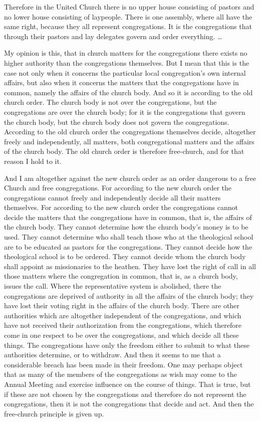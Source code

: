 {Therefore in the United Church there is no upper house consisting of pastors and no lower house consisting of laypeople. There is one assembly, where all have the same right, because they all represent congregations. It is the congregations that through their pastors and lay delegates govern and order everything. …

My opinion is this, that in church matters for the congregations there exists no higher authority than the congregations themselves. But I mean that this is the case not only when it concerns the particular local congregation’s own internal affairs, but also when it concerns the matters that the congregations have in common, namely the affairs of the church body. And so it is according to the old church order. The church body is not over the congregations, but the congregations are over the church body; for it is the congregations that govern the church body, but the church body does not govern the congregations. According to the old church order the congregations themselves decide, altogether freely and independently, all matters, both congregational matters and the affairs of the church body. The old church order is therefore free-church, and for that reason I hold to it.

And I am altogether against the new church order as an order dangerous to a free Church and free congregations. For according to the new church order the congregations cannot freely and independently decide all their matters themselves. For according to the new church order the congregations cannot decide the matters that the congregations have in common, that is, the affairs of the church body. They cannot determine how the church body’s money is to be used. They cannot determine who shall teach those who at the theological school are to be educated as pastors for the congregations. They cannot decide how the theological school is to be ordered. They cannot decide whom the church body shall appoint as missionaries to the heathen. They have lost the right of call in all those matters where the congregation in common, that is, as a church body, issues the call. Where the representative system is abolished, there the congregations are deprived of authority in all the affairs of the church body; they have lost their voting right in the affairs of the church body. There are other authorities which are altogether independent of the congregations, and which have not received their authorization from the congregations, which therefore come in one respect to be over the congregations, and which decide all these things. The congregations have only the freedom either to submit to what these authorities determine, or to withdraw. And then it seems to me that a considerable breach has been made in their freedom. One may perhaps object that as many of the members of the congregations as wish may come to the Annual Meeting and exercise influence on the course of things. That is true, but if these are not chosen by the congregations and therefore do not represent the congregations, then it is not the congregations that decide and act. And then the free-church principle is given up.

}
